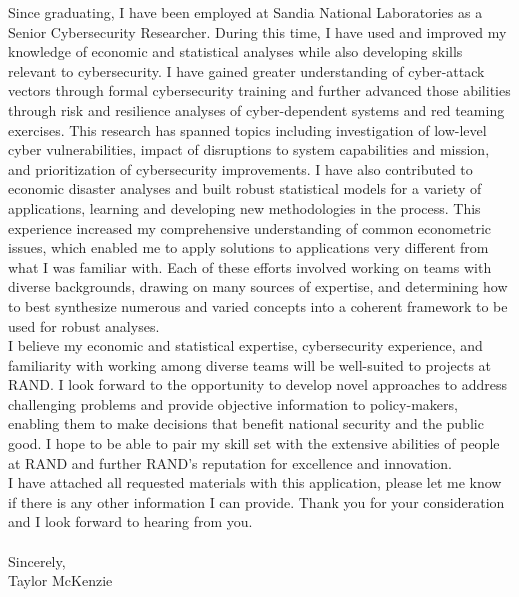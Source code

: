 \documentclass[]{article}
\begin{document}
Since graduating, I have been employed at Sandia National Laboratories as a Senior Cybersecurity Researcher. During this time, I have used and improved my knowledge of economic and statistical analyses while also developing skills relevant to cybersecurity. I have gained greater understanding of cyber-attack vectors through formal cybersecurity training and further advanced those abilities through risk and resilience analyses of cyber-dependent systems and red teaming exercises. This research has spanned topics including investigation of low-level cyber vulnerabilities, impact of disruptions to system capabilities and mission, and prioritization of cybersecurity improvements. I have also contributed to economic disaster analyses and built robust statistical models for a variety of applications, learning and developing new methodologies in the process. This experience increased my comprehensive understanding of common econometric issues, which enabled me to apply solutions to applications very different from what I was familiar with. Each of these efforts involved working on teams with diverse backgrounds, drawing on many sources of expertise, and determining how to best synthesize numerous and varied concepts into a coherent framework to be used for robust analyses.\\

I believe my economic and statistical expertise, cybersecurity experience, and familiarity with working among diverse teams will be well-suited to projects at RAND. I look forward to the opportunity to develop novel approaches to address challenging problems and provide objective information to policy-makers, enabling them to make decisions that benefit national security and the public good. I hope to be able to pair my skill set with the extensive abilities of people at RAND and further RAND's reputation for excellence and innovation.\\

I have attached all requested materials with this application, please let me know if there is any other information I can provide. Thank you for your consideration and I look forward to hearing from you.\\\\


\noindent Sincerely,\\

\noindent Taylor McKenzie
\end{document}
